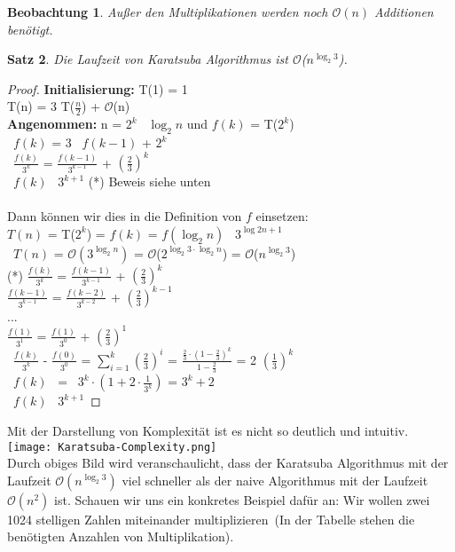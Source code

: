 \documentclass[11pt,a4paper, twoside]{article}
\newtheorem{theorem}{Satz}
\newtheorem{observation}[theorem]{Beobachtung}
\theoremstyle{definition}
\begin{document}
\begin{observation}
Außer den Multiplikationen werden noch $\mathcal{O}(n)$ Additionen benötigt.
\end{observation}

\begin{theorem}
Die Laufzeit von Karatsuba Algorithmus ist $\mathcal{O}$($n^{\log_{2}{3}}$).
\end{theorem}

\begin{proof}
\textbf{Initialisierung:} T(1) = 1\\
T(n) = 3 \cdot T($\frac{n}{2}$) + $\mathcal{O}$(n)\\
\textbf{Angenommen: } n = $2^{k}$  \Leftrightarrow \ $\log_{2}{n}$ und $f(k)$ = T($2^{k}$)\\
\Rightarrow \ $f(k)$ = 3 \cdot \ $f(k - 1)$ + $2^{k}$\\
\Leftrightarrow \ $\frac{f(k)}{3^{k}}$ = $\frac{f(k - 1)}{3^{k-1}}$ + $(\frac{2}{3})^{k}$\\
\Rightarrow \ $f(k)$ \leqslant \ $3^{k+1}$ \quad (*) Beweis siehe unten\\\\
Dann können wir dies in die Definition von \(f\) einsetzen: \\
$T(n)$ = T($2^{k}$) = $f(k)$ = $f(\log_{2}{n})$ \leqslant \ $3^{\log{2}{n}+1}$\\
\Rightarrow \ $T(n)$ = $\mathcal{O}(3^{\log_{2}{n}})$ = $\mathcal{O}$($2^{\log_{2}{3} \cdot \log_{2}{n}}$) = $\mathcal{O}$($n^{\log_{2}{3}}$)\\

(*) $\frac{f(k)}{3^{k}}$ = $\frac{f(k - 1)}{3^{k-1}}$ + $(\frac{2}{3})^{k}$\\
$\frac{f(k-1)}{3^{k-1}}$ = $\frac{f(k - 2)}{3^{k-2}}$ + $(\frac{2}{3})^{k-1}$\\
\quad ...\\
$\frac{f(1)}{3^{1}}$ = $\frac{f(1)}{3^{0}}$ + $(\frac{2}{3})^{1}$\\
\Rightarrow \ $\frac{f(k)}{3^{k}}$ - $\frac{f(0)}{3^{0}}$ = $\sum_{i = 1}^{k}(\frac{2}{3})^{i}$ = $\frac{\frac{2}{3} \cdot (1-\frac{2}{3})^k}{1-\frac{2}{3}}$ = 2 \cdot $(\frac{1}{3})^{k}$ \\
\Leftrightarrow \ $f(k)$ \ = \ $3^{k} \cdot (1 + 2 \cdot \frac{1}{3^{k}})$ = $3^{k} + 2$\\
\Rightarrow \ $f(k)$ \leqslant \ $3^{k+1}$
\end{proof}

Mit der Darstellung von Komplexität ist es nicht so deutlich und intuitiv.\\
\texttt{[image: Karatsuba-Complexity.png]} \cite{2}\\
Durch obiges Bild wird veranschaulicht, dass der Karatsuba Algorithmus mit der Laufzeit $\mathcal{O}(n^{\log_{2}{3}})$ viel schneller als der naive Algorithmus mit der Laufzeit $\mathcal{O}(n^{2})$ ist. Schauen wir uns ein konkretes Beispiel dafür an: Wir wollen zwei 1024 stelligen Zahlen miteinander multiplizieren\ (In der Tabelle \cite{1} stehen die benötigten Anzahlen von Multiplikation).\\
\end{document}
